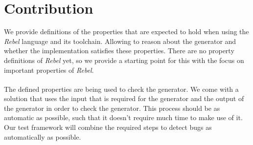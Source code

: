 \section{Contribution}
We provide definitions of the properties that are expected to hold when using
the \textit{Rebel} language and its toolchain. Allowing to reason about the
generator and whether the implementation satisfies these properties. There are
no property definitions of \textit{Rebel} yet, so we provide a starting point
for this with the focus on important properties of \textit{Rebel}.\\
\\
The defined properties are being used to check the generator. We come with a
solution that uses the input that is required for the generator and the output
of the generator in order to check the generator. This process should be as
automatic as possible, such that it doesn't require much time to make use of it.
Our test framework will combine the required steps to detect bugs as
automatically as possible.\\
\\
